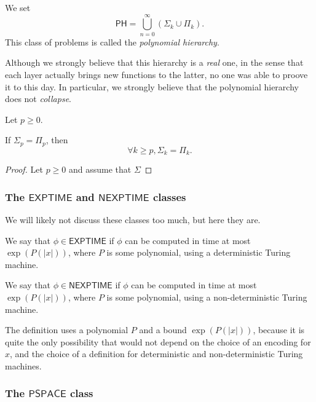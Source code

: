 \begin{definition}
    We set
    \[
        \mathsf{PH} = \bigcup_{n=0}^\infty (\mathsf \Sigma_k \cup \mathsf \Pi_k).
    \]
    This class of problems is called the \textit{polynomial hierarchy}.
\end{definition}

Although we strongly believe that this hierarchy is a \textit{real} one, in the sense that each \og layer \fg actually brings new functions to the latter, no one was able to proove it to this day. In particular, we strongly believe that the polynomial hierarchy does not \textit{collapse}.

\begin{proposition}
    Let $ p \ge 0 $.

    If $ \mathsf \Sigma_p = \mathsf \Pi_p $, then
    \[
        \forall k \ge p, \mathsf \Sigma_k = \mathsf \Pi_k.
    \]
\end{proposition}

\begin{proof}
    Let $ p \ge 0 $ and assume that $ \Sigma $
\end{proof}

\subsubsection{The $ \mathsf{EXPTIME} $ and $ \mathsf{NEXPTIME} $ classes}

We will likely not discuss these classes too much, but here they are.

\begin{definition}
    We say that $ \phi \in \mathsf{EXPTIME} $ if $ \phi $ can be computed in time at most $ \exp(P(|x|)) $, where $ P $ is some polynomial, using a deterministic Turing machine.

    We say that $ \phi \in \mathsf{NEXPTIME} $ if $ \phi $ can be computed in time at most $ \exp(P(|x|)) $, where $ P $ is some polynomial, using a non-deterministic Turing machine.
\end{definition}

The definition uses a polynomial $ P $ and a bound $ \exp(P(|x|)) $, because it is quite the only possibility that would not depend on the choice of an encoding for $ x $, and the choice of a definition for deterministic and non-deterministic Turing machines.

\subsubsection{The $ \mathsf{PSPACE} $ class}


